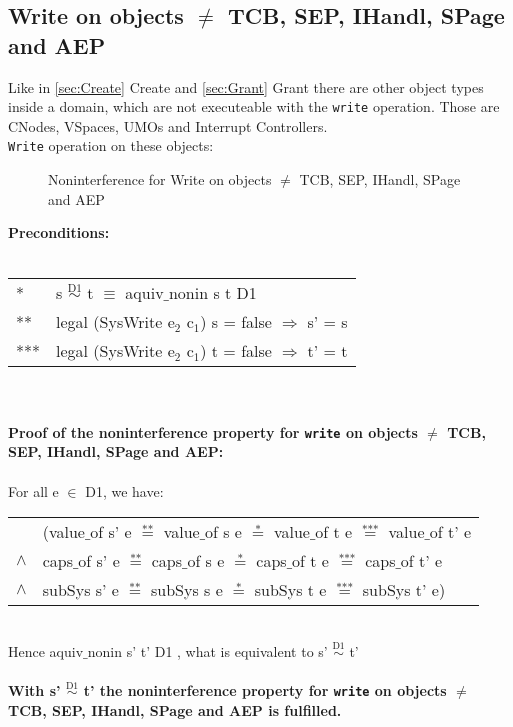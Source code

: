 \subsection{Write on objects $\neq$ TCB, SEP, IHandl, SPage and AEP}\label{WriteOthers}
Like in \ref{sec:Create} Create and \ref{sec:Grant} Grant there are other object types inside a domain, which are not executeable with the \texttt{write} operation. Those are CNodes, VSpaces, UMOs and Interrupt Controllers. \\
\texttt{Write} operation on these objects: \\
\begin{figure}[H]
\caption{Noninterference for Write on objects $\neq$ TCB, SEP, IHandl, SPage and AEP}
\end{figure}
\textbf{Preconditions:} \\ \\
\begin{tabular}{ll}
* & s $\overset{\text{D1}}{\sim}$ t $\equiv$ aquiv$\_$nonin s t D1	\\ 
** & legal (SysWrite e$_2$ c$_1$) s = false $\Rightarrow$ s' = s \\ 
*** & legal (SysWrite e$_2$ c$_1$) t = false $\Rightarrow$ t' = t
\end{tabular} \\ \\ 
\textbf{Proof of the noninterference property for \texttt{write} on objects $\neq$ TCB, SEP, IHandl, SPage and AEP:}\\ \\
For all e $\in$ D1, we have: \\ 
\begin{tabular}{ll}
& (value$\_$of s' e $\overset{\text{**}}{=}$ value$\_$of s e $\overset{\text{*}}{=}$ value$\_$of t e $\overset{\text{***}}{=}$ value$\_$of t' e \\
$\wedge$ & caps$\_$of s' e $\overset{\text{**}}{=}$ caps$\_$of s e $\overset{\text{*}}{=}$ caps$\_$of t e $\overset{\text{***}}{=}$ caps$\_$of t' e \\
$\wedge$ & subSys s' e $\overset{\text{**}}{=}$ subSys s e $\overset{\text{*}}{=}$ subSys t e $\overset{\text{***}}{=}$ subSys t' e)
\end{tabular} \\
Hence aquiv$\_$nonin s' t' D1 , what is equivalent to s' $\overset{\text{D1}}{\sim}$ t'\\ \\ 
\textbf{With s' $\overset{\text{D1}}{\sim}$ t' the noninterference property for \texttt{write} on objects $\neq$ TCB, SEP, IHandl, SPage and AEP is fulfilled.} 
